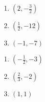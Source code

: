 \documentclass{ximera}
\begin{document}
\begin{multicols}{3}
\begin{enumerate}
\setcounter{enumi}{\value{HW}}

\item $\left(2, -\frac{3}{2}\right)$
\item $\left(\frac{1}{2}, -12 \right)$
\item $(-1,-7)$

\setcounter{HW}{\value{enumi}}
\end{enumerate}
\end{multicols}

\begin{multicols}{3}
\begin{enumerate}
\setcounter{enumi}{\value{HW}}

\item $\left(-\frac{1}{2}, -3\right)$
\item $\left(\frac{2}{3}, -2 \right)$
\item $(1,1)$

\setcounter{HW}{\value{enumi}}
\end{enumerate}
\end{multicols}
\end{document}
